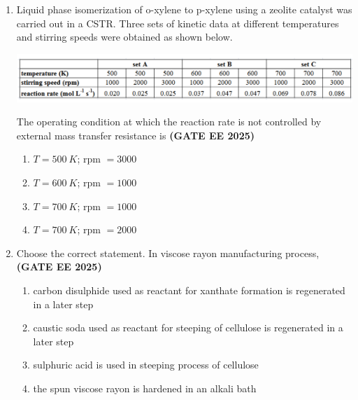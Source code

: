 \documentclass[journal,12pt,onecolumn]{IEEEtran}
\theoremstyle{remark}
\begin{document}
\begin{enumerate}
\item  Liquid phase isomerization of o-xylene to p-xylene using a zeolite catalyst was carried out in a CSTR. Three sets of kinetic data at different temperatures and stirring speeds were obtained as shown below.
\begin{center}
\includegraphics[width=1\textwidth]{figs/16.png}
\end{center}
The operating condition at which the reaction rate is not controlled by external mass transfer resistance is
\hfill \textbf{(GATE EE 2025)} \begin{enumerate}
    \item $T=500~K$; rpm $=3000$
    \item $T=600~K$; rpm $=1000$
    \item $T=700~K$; rpm $=1000$
    \item $T=700~K$; rpm $=2000$
\end{enumerate}


\item Choose the correct statement. In viscose rayon manufacturing process,
\hfill \textbf{(GATE EE 2025)} \begin{enumerate}
    \item carbon disulphide used as reactant for xanthate formation is regenerated in a later step
    \item caustic soda used as reactant for steeping of cellulose is regenerated in a later step
    \item sulphuric acid is used in steeping process of cellulose
    \item the spun viscose rayon is hardened in an alkali bath
\end{enumerate}



\end{enumerate}
\end{document}
